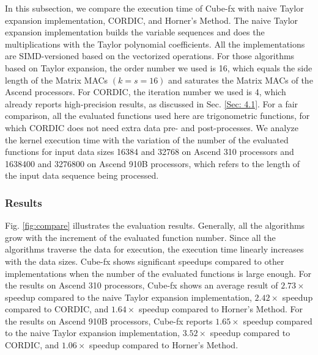 In this subsection, we compare the execution time of Cube-fx with naive Taylor expansion implementation, CORDIC, and Horner's Method. The naive Taylor expansion implementation builds the variable sequences and does the multiplications with the Taylor polynomial coefficients. All the implementations are SIMD-versioned based on the vectorized operations. For those algorithms based on Taylor expansion, the order number we used is 16, which equals the side length of the Matrix MACs $(k = s = 16)$ and saturates the Matrix MACs of the Ascend processors. For CORDIC, the iteration number we used is 4, which already reports high-precision results, as discussed in Sec. \ref{Sec: 4.1}. For a fair comparison, all the evaluated functions used here are trigonometric functions, for which CORDIC does not need extra data pre- and post-processes. We analyze the kernel execution time with the variation of the number of the evaluated functions for input data sizes 16384 and 32768 on Ascend 310 processors and 1638400 and 3276800 on Ascend 910B processors, which refers to the length of the input data sequence being processed.

\subsubsection{Results}

Fig. \ref{fig:compare} illustrates the evaluation results. Generally, all the algorithms grow with the increment of the evaluated function number. Since all the algorithms traverse the data for execution, the execution time linearly increases with the data sizes. Cube-fx shows significant speedups compared to other implementations when the number of the evaluated functions is large enough. For the results on Ascend 310 processors, Cube-fx shows an average result of $2.73\times$ speedup compared to the naive Taylor expansion implementation, $2.42\times$ speedup compared to CORDIC, and $1.64\times$ speedup compared to Horner's Method. For the results on Ascend 910B processors, Cube-fx reports $1.65\times$ speedup compared to the naive Taylor expansion implementation, $3.52\times$ speedup compared to CORDIC, and $1.06\times$ speedup compared to Horner's Method.

